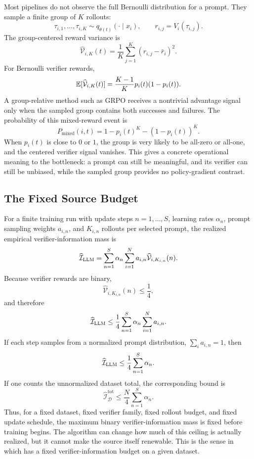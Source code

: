 Most \llm{} \rlvr{} pipelines do not observe the full Bernoulli distribution for a prompt. They sample a finite group of $K$ rollouts:
\[
  \tau_{i,1},\ldots,\tau_{i,K}
  \sim
  q_{\theta(t)}(\cdot\mid x_i),
  \qquad
  r_{i,j}=V_i(\tau_{i,j}).
\]
The group-centered reward variance is
\[
  \widehat{\mathcal{V}}_{i,K}(t)
  =
  \frac{1}{K}
  \sum_{j=1}^K
  (r_{i,j}-\bar r_i)^2.
\]
For Bernoulli verifier rewards,
\[
  \mathbb{E}[\widehat{\mathcal{V}}_{i,K}(t)]
  =
  \frac{K-1}{K}
  p_i(t)(1-p_i(t)).
\]
A group-relative method such as GRPO receives a nontrivial advantage signal only when the sampled group contains both successes and failures. The probability of this mixed-reward event is
\[
  P_{\mathrm{mixed}}(i,t)
  =
  1-p_i(t)^K-(1-p_i(t))^K.
\]
When $p_i(t)$ is close to $0$ or $1$, the group is very likely to be all-zero or all-one, and the centered verifier signal vanishes. This gives a concrete operational meaning to the bottleneck: a prompt can still be meaningful, and its verifier can still be unbiased, while the sampled group provides no policy-gradient contrast.

\subsection{The Fixed Source Budget}

For a finite training run with update steps $n=1,\ldots,S$, learning rates $\alpha_n$, prompt sampling weights $a_{i,n}$, and $K_{i,n}$ rollouts per selected prompt, the realized empirical verifier-information mass is
\[
  \widehat{\mathcal{I}}_{\textsc{LLM}}
  =
  \sum_{n=1}^{S}
  \alpha_n
  \sum_{i=1}^{N}
  a_{i,n}
  \widehat{\mathcal{V}}_{i,K_{i,n}}(n).
\]
Because verifier rewards are binary,
\[
  \widehat{\mathcal{V}}_{i,K_{i,n}}(n)\le \frac{1}{4},
\]
and therefore
\[
  \widehat{\mathcal{I}}_{\textsc{LLM}}
  \le
  \frac{1}{4}
  \sum_{n=1}^{S}
  \alpha_n
  \sum_{i=1}^{N}
  a_{i,n}.
\]
If each step samples from a normalized prompt distribution, $\sum_i a_{i,n}=1$, then
\[
  \widehat{\mathcal{I}}_{\textsc{LLM}}
  \le
  \frac{1}{4}
  \sum_{n=1}^{S}\alpha_n.
\]
If one counts the unnormalized dataset total, the corresponding bound is
\[
  \widehat{\mathcal{I}}_{\mathcal{D}}^{\mathrm{tot}}
  \le
  \frac{N}{4}
  \sum_{n=1}^{S}\alpha_n.
\]
Thus, for a fixed dataset, fixed verifier family, fixed rollout budget, and fixed update schedule, the maximum binary verifier-information mass is fixed before training begins. The algorithm can change how much of this ceiling is actually realized, but it cannot make the source itself renewable. This is the sense in which \llm{} \rlvr{} has a fixed verifier-information budget on a given dataset.

